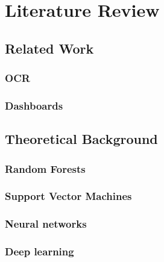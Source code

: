 \chapter{Literature Review}
\label{chap:lit_rev}
\section{Related Work}
\subsection{OCR}
\subsection{Dashboards}
\section{Theoretical Background}
\subsection{Random Forests}
\subsection{Support Vector Machines}
\subsection{Neural networks}
\subsection{Deep learning}